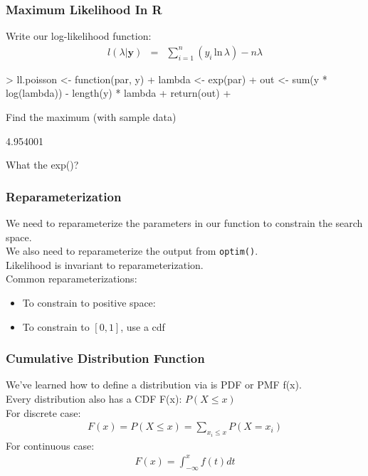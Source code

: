 \documentclass[handout]{beamer}
\begin{document}
\begin{frame}[fragile]
\frametitle{Maximum Likelihood In R}
\pause
Write our log-likelihood function:
\pause
\begin{eqnarray*}
l(\lambda | \mathbf{y}) &=& \sum_{i=1}^n (y_i \, \mathrm{ln} \, \lambda)
- n\lambda 
\end{eqnarray*}
\pause
\tiny
\begin{Schunk}
\begin{Sinput}
> ll.poisson <- function(par, y) {
+     lambda <- exp(par)
+     out <- sum(y * log(lambda)) - length(y) * lambda
+     return(out)
+ }
\end{Sinput}
\end{Schunk}
\pause
\normalsize
\bigskip
Find the maximum (with sample data) 
\tiny
\begin{Schunk}
\begin{Soutput}
[1] 4.954001
\end{Soutput}
\end{Schunk}
\normalsize
\pause
What the exp()?
\end{frame}

\begin{frame}
\frametitle{Reparameterization}
\pause
We need to reparameterize the parameters in our function to constrain
the search space. \\
\pause
\bigskip
We also need to reparameterize the output from {\tt optim()}. \\
\bigskip
\pause
Likelihood is invariant to reparameterization. \\
\bigskip
\pause
Common reparameterizations:
\pause
\begin{itemize}
\item To constrain to positive space: 
\pause
\item To constrain to $[0,1]$, \pause use a cdf
\end{itemize}
\end{frame}

\begin{frame}
\frametitle{Cumulative Distribution Function}
\pause
We've learned how to define a distribution via is PDF or PMF f(x). \\
\pause
\bigskip
Every distribution also has a CDF F(x): \pause $P(X \le x)$\\
\pause
\bigskip
For discrete case:
\begin{eqnarray*}
F(x) = P(X \le x) = \sum_{x_i \le x} P(X = x_i)
\end{eqnarray*}
\pause
For continuous case:
\begin{eqnarray*}
F(x) = \int_{-\infty}^x f(t) dt
\end{eqnarray*}
\end{frame}
\end{document}
